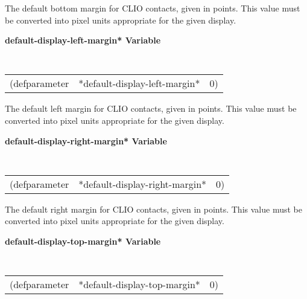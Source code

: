 \begin{flushright} \parbox[t]{6.125in}{
The default bottom margin for CLIO  contacts, given in
points. This value must be converted into pixel units appropriate for the given
display.

}\end{flushright}

{\samepage
{\large {\bf *default-display-left-margin* \hfill Variable}} 
\begin{flushright} \parbox[t]{6.125in}{
\tt
\begin{tabular}{lll}
\raggedright
(defparameter & *default-display-left-margin* & 0)
\end{tabular}
\rm

}\end{flushright}}

\begin{flushright} \parbox[t]{6.125in}{
The default left margin for CLIO  contacts, given in
points. This value must be converted into pixel units appropriate for the given
display.

}\end{flushright}

{\samepage
{\large {\bf *default-display-right-margin* \hfill Variable}} 
\begin{flushright} \parbox[t]{6.125in}{
\tt
\begin{tabular}{lll}
\raggedright
(defparameter & *default-display-right-margin* & 0)
\end{tabular}
\rm

}\end{flushright}}

\begin{flushright} \parbox[t]{6.125in}{
The default right margin for CLIO  contacts, given in
points. This value must be converted into pixel units appropriate for the given
display.

}\end{flushright}



{\samepage
{\large {\bf *default-display-top-margin* \hfill Variable}} 
\begin{flushright} \parbox[t]{6.125in}{
\tt
\begin{tabular}{lll}
\raggedright
(defparameter & *default-display-top-margin* & 0)
\end{tabular}
\rm

}\end{flushright}}


